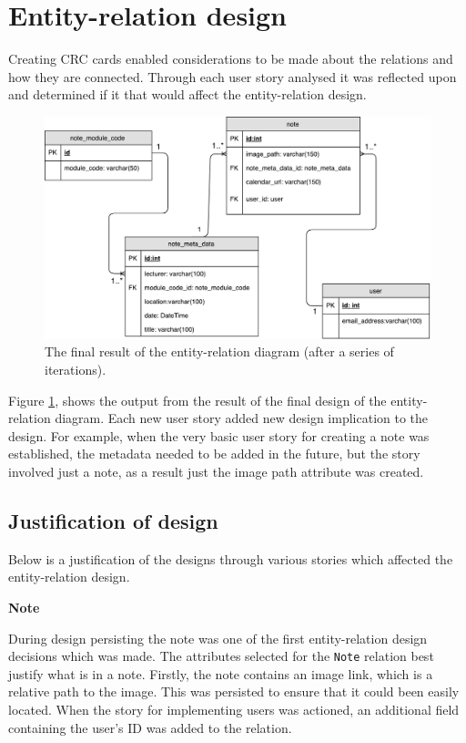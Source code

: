 \section{Entity-relation design}\label{section:er_diagram}
Creating CRC cards enabled considerations to be made about the relations and how they are connected. Through each user story analysed it was reflected upon and determined if it that would affect the entity-relation design.

\begin{figure}[H]
  \centering
  \includegraphics[scale=0.5]{images/database_diagram.pdf}
  \caption{The final result of the entity-relation diagram (after a series of iterations).}
  \label{fig:database}
\end{figure}

Figure \ref{fig:database}, shows the output from the result of the final design of the entity-relation diagram. Each new user story added new design implication to the design. For example, when the very basic user story for creating a note was established, the metadata needed to be added in the future, but the story involved just a note, as a result just the image path attribute was created.

\subsection{Justification of design}
Below is a justification of the designs through various stories which affected the entity-relation design.

\noindent
\textbf{Note}

During design persisting the note was one of the first entity-relation design decisions which was made. The attributes selected for the \texttt{Note} relation best justify what is in a note. Firstly, the note contains an image link, which is a relative path to the image. This was persisted to ensure that it could been easily located. When the story for implementing users was actioned, an additional field containing the user's ID was added to the relation.

